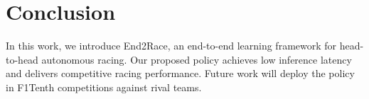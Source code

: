 \documentclass[letterpaper,10 pt,conference]{ieeeconf}
\begin{document}
\section{Conclusion}

In this work, we introduce End2Race, an end-to-end learning framework for head-to-head autonomous racing. Our proposed policy achieves low inference latency and delivers competitive racing performance. Future work will deploy the policy in F1Tenth competitions against rival teams.



\end{document}
